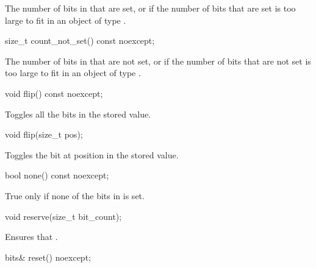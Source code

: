 \begin{addedblock}
\begin{itemdescr}
\returns The number of bits in  that are set, or  if the number of bits that are set is too large to fit in an object of type .
\end{itemdescr}

\begin{itemdecl}
size_t count_not_set() const noexcept;	
\end{itemdecl}

\begin{itemdescr}
\returns The number of bits in  that are not set, or  if the number of bits that are not set is too large to fit in an object of type .
\end{itemdescr}

\begin{itemdecl}
void flip() const noexcept;	
\end{itemdecl}

\begin{itemdescr}
\effects Toggles all the bits in the stored value. 
\end{itemdescr}

\begin{itemdecl}
void flip(size_t pos);	
\end{itemdecl}

\begin{itemdescr}
\effects Toggles the bit at position  in the stored value.
\end{itemdescr}

\begin{itemdecl}
bool none() const noexcept;	
\end{itemdecl}

\begin{itemdescr}
\returns True only if none of the bits in  is set.
\end{itemdescr}

\begin{itemdecl}
void reserve(size_t bit_count);	
\end{itemdecl}

\begin{itemdescr}
\effects Ensures that .	
\end{itemdescr}

\begin{itemdecl}
bits& reset() noexcept;	
\end{itemdecl}


\end{addedblock}

